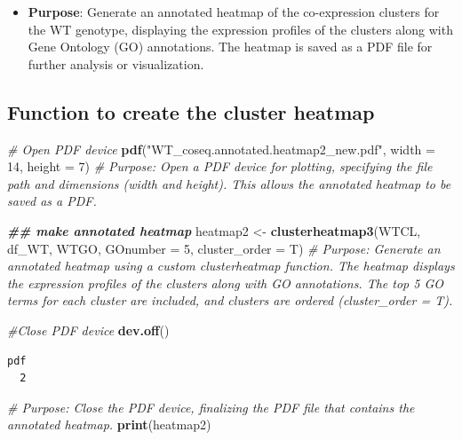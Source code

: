 \documentclass[
  11pt,
]{article}
\newenvironment{Shaded}{\begin{snugshade}}{\end{snugshade}}
\newcommand{\AttributeTok}[1]{\textcolor[rgb]{0.13,0.29,0.53}{#1}}
\newcommand{\CommentTok}[1]{\textcolor[rgb]{0.56,0.35,0.01}{\textit{#1}}}
\newcommand{\DecValTok}[1]{\textcolor[rgb]{0.00,0.00,0.81}{#1}}
\newcommand{\DocumentationTok}[1]{\textcolor[rgb]{0.56,0.35,0.01}{\textbf{\textit{#1}}}}
\newcommand{\FunctionTok}[1]{\textcolor[rgb]{0.13,0.29,0.53}{\textbf{#1}}}
\newcommand{\NormalTok}[1]{#1}
\newcommand{\OtherTok}[1]{\textcolor[rgb]{0.56,0.35,0.01}{#1}}
\newcommand{\StringTok}[1]{\textcolor[rgb]{0.31,0.60,0.02}{#1}}
\providecommand{\tightlist}{%
  \setlength{\itemsep}{0pt}\setlength{\parskip}{0pt}}\usepackage{longtable,booktabs,array}
\begin{document}
\begin{itemize}
\tightlist
\item
  \textbf{Purpose}: Generate an annotated heatmap of the co-expression
  clusters for the WT genotype, displaying the expression profiles of
  the clusters along with Gene Ontology (GO) annotations. The heatmap is
  saved as a PDF file for further analysis or visualization.
\end{itemize}

\subsection{Function to create the cluster
heatmap}\label{function-to-create-the-cluster-heatmap}

\begin{Shaded}
\begin{Highlighting}[]
\CommentTok{\# Open PDF device}
\FunctionTok{pdf}\NormalTok{(}\StringTok{"WT\_coseq.annotated.heatmap2\_new.pdf"}\NormalTok{, }\AttributeTok{width =} \DecValTok{14}\NormalTok{, }\AttributeTok{height =} \DecValTok{7}\NormalTok{)}
\CommentTok{\# Purpose: Open a PDF device for plotting, specifying the file path and dimensions (width and height). This allows the annotated heatmap to be saved as a PDF.}

\DocumentationTok{\#\# make annotated heatmap}
\NormalTok{heatmap2 }\OtherTok{\textless{}{-}} \FunctionTok{clusterheatmap3}\NormalTok{(WTCL, df\_WT, WTGO, }\AttributeTok{GOnumber =} \DecValTok{5}\NormalTok{, }\AttributeTok{cluster\_order =}\NormalTok{ T)}
\CommentTok{\# Purpose: Generate an annotated heatmap using a custom \textasciigrave{}clusterheatmap\textasciigrave{} function. The heatmap displays the expression profiles of the clusters along with GO annotations. The top 5 GO terms for each cluster are included, and clusters are ordered (\textasciigrave{}cluster\_order = T\textasciigrave{}).}

\CommentTok{\#Close PDF device}
\FunctionTok{dev.off}\NormalTok{()}
\end{Highlighting}
\end{Shaded}

\begin{verbatim}
pdf 
  2 
\end{verbatim}

\begin{Shaded}
\begin{Highlighting}[]
\CommentTok{\# Purpose: Close the PDF device, finalizing the PDF file that contains the annotated heatmap.}
\FunctionTok{print}\NormalTok{(heatmap2)}
\end{Highlighting}
\end{Shaded}
\end{document}
